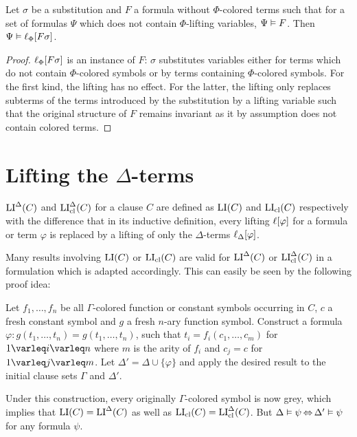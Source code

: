 \documentclass[,%
	draft=false,%
	numbers=noendperiod
	11pt,
	a4paper,
	oneside,%
	openany,
]{memoir}
\begin{document}
\begin{lemma}
	\label{lemma:substitute_and_lift}
	Let $\sigma$ be a substitution and $F$ a formula without $\Phi$-colored terms such that for a set of formulas $\Psi$ which does not contain $\Phi$-lifting variables, $\Psi \vDash F$.
	Then $\Psi \vDash \ell_{\Phi}[F\sigma]$.
\end{lemma}
\begin{proof}
	$\ell_{\Phi}[F\sigma]$ is an instance of $F$:
	$\sigma$ substitutes variables either for terms which do not contain $\Phi$-colored symbols or by terms containing $\Phi$-colored symbols.
	For the first kind, the lifting has no effect.
	For the latter, the lifting only replaces subterms of the terms introduced by the substitution by a lifting variable such that the original structure of $F$ remains invariant as it by assumption does not contain colored terms.
\end{proof}

\section{Lifting the $\Delta$-terms}

\begin{defi}
	$\operatorname{LI}^\Delta(C)$ and $\operatorname{LI}_{\operatorname{cl}}^\Delta(C)$ for a clause $C$ are defined as $\operatorname{LI}(C)$ and $\operatorname{LI}_{\operatorname{cl}}(C)$ respectively with the difference that in its inductive definition, every lifting $\ell[\varphi]$ for a formula or term $\varphi$ is replaced by a lifting of only the $\Delta$-terms $\ell_{\Delta}[\varphi]$.
\end{defi}

\begin{remark}
	Many results involving $\operatorname{LI}(C)$ or $\operatorname{LI}_{\operatorname{cl}}(C)$ are valid for $\operatorname{LI}^\Delta(C)$ or $\operatorname{LI}_{\operatorname{cl}}^\Delta(C)$
	in a formulation which is adapted accordingly.
	This can easily be seen by the following proof idea:

	Let $f_1, \dots, f_n$ be all $\Gamma$-colored function or constant symbols occurring in $C$,
	$c$ a fresh constant symbol and $g$ a fresh $n$-ary function symbol.
	Construct a formula $\varphi:  g(t_1, \dots, t_n) = g(t_1, \dots, t_n)$,
	such that $t_i = f_i(c_1, \dots, c_m)$ for $1\varleq i \varleq n$ where $m$ is the arity of $f_i$ and $c_j = c$ for $1\varleq j \varleq m$. Let $\Delta' = \Delta \cup \{\varphi\}$ and apply the desired result to the initial clause sets $\Gamma$ and $\Delta'$.

	Under this construction, every originally $\Gamma$-colored symbol is now grey, which implies that $\operatorname{LI}(C) = \operatorname{LI}^\Delta(C)$ as well as $\operatorname{LI}_{\operatorname{cl}}(C) = \operatorname{LI}_{\operatorname{cl}}^\Delta(C)$.
	But $\Delta\vDash \psi \operatorname{\Leftrightarrow} \Delta'\vDash \psi$ for any formula $\psi$.
\end{remark}
\end{document}
